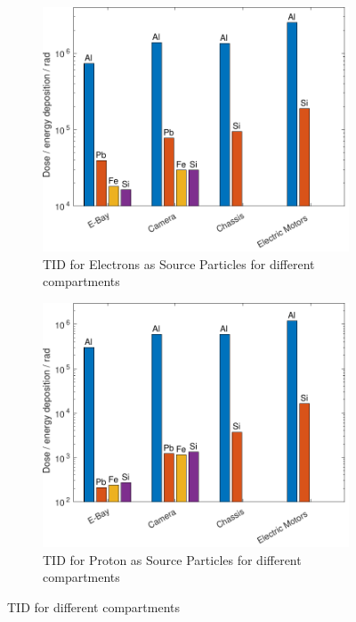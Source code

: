 \begin{figure}[htb]
     \centering
     \begin{subfigure}[b]{0.49\textwidth}
         \centering
         \includegraphics[width=\textwidth]{Media/J_Electron_Compartments}
         \caption{TID for Electrons as Source Particles for different compartments}
         \label{fig:TIDElectronShielding}
     \end{subfigure}
     \hfill
     \begin{subfigure}[b]{0.49\textwidth}
         \centering
         \includegraphics[width=\textwidth]{Media/J_Proton_Compartments}
         \caption{TID for Proton as Source Particles for different compartments}
         \label{fig:TIDProtonShielding}
     \end{subfigure}
     \caption{TID for different compartments}
     \label{fig:CompartmentTID}
\end{figure}

\cleardoublepage